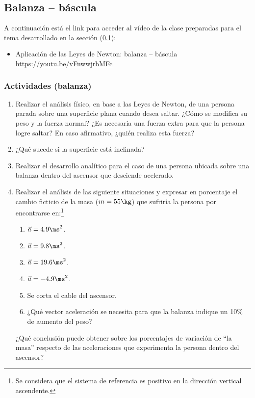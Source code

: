 \subsection{Balanza -- báscula}
\label{c.bb}

A continuación está el link para acceder al vídeo de la clase preparadas para el
tema desarrollado en la sección (\ref{c.bb}):

\begin{itemize}
  \item Aplicación de las Leyes de Newton: balanza -- báscula \\
    \href{https://youtu.be/vFnwwjrbMFc}{https://youtu.be/vFnwwjrbMFc}
\end{itemize}

\subsubsection*{Actividades (balanza)}
\small
\begin{enumerate}
  \item Realizar el análisis físico, en base a las Leyes de Newton, de una
  persona parada sobre una superficie plana cuando desea saltar. ¿Cómo se
  modifica su peso y la fuerza normal? ¿Es necesaria una fuerza extra para que
  la persona logre saltar? En caso afirmativo, ¿quién realiza esta fuerza?
  \item ¿Qué sucede si la superficie está inclinada?
  \item Realizar el desarrollo analítico para el caso de una persona ubicada
  sobre una balanza dentro del ascensor que desciende acelerado.
  \item Realizar el análisis de las siguiente situaciones y expresar en
  porcentaje el cambio ficticio de la masa ($m=55\kg$) que sufriría la persona
  por encontrarse en:\footnote{Se considera que el sistema de referencia es
  positivo en la dirección vertical ascendente.}
    \begin{enumerate}
      \item $\vec{a}=4.9\ms^2$.
      \item $\vec{a}=9.8\ms^2$.
      \item $\vec{a}=19.6\ms^2$.
      \item $\vec{a}=-4.9\ms^2$.
      \item Se corta el cable del ascensor.
      \item ¿Qué vector aceleración se necesita para que la balanza indique un
      10\% de aumento del peso?
    \end{enumerate}
    ¿Qué conclusión puede obtener sobre los porcentajes de variación de ``la
    masa'' respecto de las aceleraciones que experimenta la persona dentro del
    ascensor?
\end{enumerate}
\normalsize



